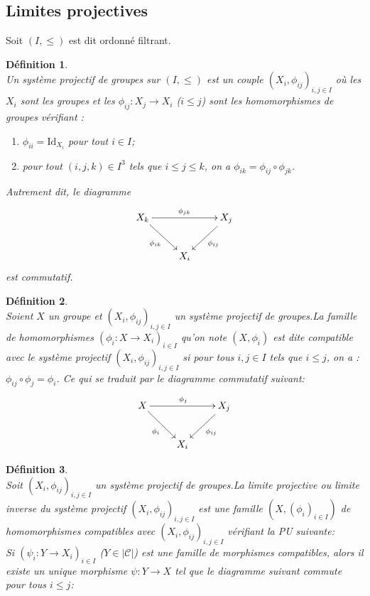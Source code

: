 \documentclass[a4paper, 14pt]{report}
\newtheorem{definition}{Définition}[section]
\begin{document}
\begin{onehalfspace}
{			\subsection{Limites projectives}
			Soit $(I,\leq)$ est dit ordonné filtrant.
			\begin{definition} \cite{maclane1971categories}\\
Un système projectif de groupes sur $(I,\leq)$ est un couple $(X_{i},\phi_{ij})_{i,j \in I}$ où les $X_{i}$ sont les groupes et les $\phi_{ij}:X_{j} \rightarrow X_{i}$  ($i \leq j$) sont les homomorphismes de groupes vérifiant :
				\begin{enumerate}[label=\roman*)]
					\item $\phi_{ii} = \text{Id}_{X_{i}}$ pour tout $i \in I$;
					\item pour tout $(i,j,k) \in I^{3}$ tels que $i \leq j \leq k$, on a $\phi_{ik} = \phi_{ij} \circ \phi_{jk}$.
				\end{enumerate}
				Autrement dit, le diagramme
				\[
				\xymatrix{
					X_{k} \ar[rr]^{\phi_{jk}} \ar[dr]_{\phi_{ik}} & & X_{j} \ar[dl]^{\phi_{ij}} \\
					& X_{i} &
				}
				\]
				est commutatif.
			\end{definition}
			
			
			\begin{definition}  \cite{maclane1971categories}\\
Soient $X$ un groupe et $(X_{i}, \phi_{ij})_{i,j \in I}$ un système projectif de groupes.La famille de homomorphismes $(\phi_{i} : X \rightarrow X_{i})_{i \in I}$ qu'on note $( X ,\phi_{i})$ est dite compatible avec le système projectif $(X_{i}, \phi_{ij})_{i,j \in I}$ si pour tous $i,j \in I$ tels que $i \leq j$, on a : $\phi_{ij} \circ \phi_{j} = \phi_{i}$.
Ce qui se traduit par le diagramme commutatif suivant:
				\[
				\xymatrix{
					X \ar[rr]^{\phi_{j}} \ar[dr]_{\phi_{i}} & & X_{j} \ar[dl]^{\phi_{ij}} \\
					& X_{i} &
				}
				\]
				
			\end{definition}
			
			\begin{definition}  \cite{maclane1971categories}\\
Soit $(X_{i},\phi_{ij})_{i,j \in I}$ un système projectif de groupes.La limite projective ou limite inverse du système projectif $(X_{i},\phi_{ij})_{i,j \in I}$  est une famille $(X,(\phi_{i})_{i \in I})$ de homomorphismes compatibles avec $(X_{i},\phi_{ij})_{i,j \in I}$ vérifiant la PU suivante: \\
Si $(\psi _{i} : Y \rightarrow X_{i})_{i \in I}$ ($ Y \in |\mathcal{C}|$) est une famille de morphismes compatibles, alors il existe un unique morphisme $\psi : Y \rightarrow X $ tel que le diagramme suivant commute pour tous $i \leq j$:
				

\end{definition}}
\end{onehalfspace}
\end{document}
